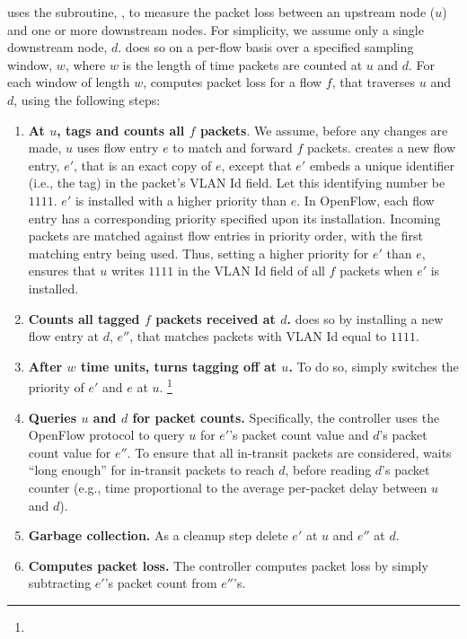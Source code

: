 \fl uses the subroutine, \pcnts, to measure the packet loss between an upstream node ($u$) and one or more downstream nodes.  For simplicity, we assume only a single downstream node, $d$. 
\pcnt does so on a per-flow basis over a specified sampling window, $w$, 
where $w$ is the length of time packets are counted at $u$ and $d$. For each window of length $w$, \pcnt computes packet loss for a flow $f$, that traverses $u$ and $d$, using the following steps:
\begin{enumerate}
	\item 
	\textbf{At $u$, tags and counts all $f$ packets}.  
	We assume, before any changes are made, $u$ uses flow entry $e$ to match and forward $f$ packets.
	\pcnt creates a new flow entry, $e'$, that is an exact copy of $e$, except that $e'$ embeds a unique identifier (i.e., the tag) in the packet's VLAN Id field.  Let this identifying number
	be $1111$.
	$e'$ is installed with a higher priority than $e$.  In OpenFlow, each flow entry has a corresponding priority specified upon its installation.
	Incoming packets are matched against flow entries in priority order, with the first matching entry being used. 
	Thus, setting a higher priority for $e'$ than $e$, ensures that $u$ writes $1111$ in the VLAN Id field of all $f$ packets when $e'$ is installed.

	\item
	\textbf{Counts all tagged $f$ packets received at $d$.} \pcnt does so by installing a new flow entry at $d$, $e''$, that matches packets with VLAN Id equal to $1111$. 

	\item 
	\textbf{After $w$ time units, turns tagging off at $u$.} To do so, \pcnt simply switches the priority of $e'$ and $e$ at $u$. 
	\footnote{}

	\item
	\textbf{Queries $u$ and $d$ for packet counts.} 
	Specifically, the controller uses the OpenFlow protocol to query $u$ for $e'$'s packet count value and $d$'s packet count value for $e''$.
	To ensure that all in-transit packets are considered, \pcnt waits ``long enough'' for in-transit packets to reach $d$, before reading $d$'s packet counter 
	(e.g., time proportional to the average per-packet delay between $u$ and $d$).

	\item
	\textbf{Garbage collection.}
	As a cleanup step delete $e'$ at $u$ and $e''$ at $d$.

	\item 
	\textbf{Computes packet loss.}
	The controller computes packet loss by simply subtracting $e'$'s packet count from $e''$'s. 

\end{enumerate}
